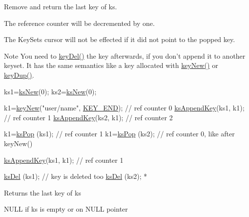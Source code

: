 Remove and return the last key of {\ttfamily ks}.

The reference counter will be decremented by one.

The Key\-Sets cursor will not be effected if it did not point to the popped key.

\begin{DoxyNote}{Note}
You need to \hyperlink{group__key_ga3df95bbc2494e3e6703ece5639be5bb1}{key\-Del()} the key afterwards, if you don't append it to another keyset. It has the same semantics like a key allocated with \hyperlink{group__key_gad23c65b44bf48d773759e1f9a4d43b89}{key\-New()} or \hyperlink{group__key_gae6ec6a60cc4b8c1463fa08623d056ce3}{key\-Dup()}.
\end{DoxyNote}

\begin{DoxyCode}
ks1=\hyperlink{group__keyset_ga671e1aaee3ae9dc13b4834a4ddbd2c3c}{ksNew}(0);
ks2=\hyperlink{group__keyset_ga671e1aaee3ae9dc13b4834a4ddbd2c3c}{ksNew}(0);

k1=\hyperlink{group__key_gad23c65b44bf48d773759e1f9a4d43b89}{keyNew}(\textcolor{stringliteral}{"user/name"}, \hyperlink{group__key_gga91fb3178848bd682000958089abbaf40aa8adb6fcb92dec58fb19410eacfdd403}{KEY\_END}); \textcolor{comment}{// ref counter 0}
\hyperlink{group__keyset_gaa5a1d467a4d71041edce68ea7748ce45}{ksAppendKey}(ks1, k1); \textcolor{comment}{// ref counter 1}
\hyperlink{group__keyset_gaa5a1d467a4d71041edce68ea7748ce45}{ksAppendKey}(ks2, k1); \textcolor{comment}{// ref counter 2}

k1=\hyperlink{group__keyset_gae42530b04defb772059de0600159cf69}{ksPop} (ks1); \textcolor{comment}{// ref counter 1}
k1=\hyperlink{group__keyset_gae42530b04defb772059de0600159cf69}{ksPop} (ks2); \textcolor{comment}{// ref counter 0, like after keyNew()}

\hyperlink{group__keyset_gaa5a1d467a4d71041edce68ea7748ce45}{ksAppendKey}(ks1, k1); \textcolor{comment}{// ref counter 1}

\hyperlink{group__keyset_ga27e5c16473b02a422238c8d970db7ac8}{ksDel} (ks1); \textcolor{comment}{// key is deleted too}
\hyperlink{group__keyset_ga27e5c16473b02a422238c8d970db7ac8}{ksDel} (ks2);
 *
\end{DoxyCode}


\begin{DoxyReturn}{Returns}
the last key of {\ttfamily ks} 

N\-U\-L\-L if {\ttfamily ks} is empty or on N\-U\-L\-L pointer 
\end{DoxyReturn}

